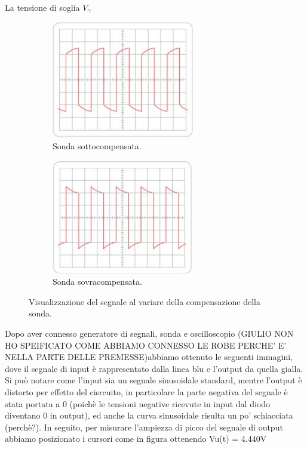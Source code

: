 \documentclass[a4paper]{article}
\begin{document}
{{				La tensione di soglia $ V_{\mathrm{\gamma}} $
				\begin{figure}[h!]
					\centering
					\begin{subfigure}{0.4\textwidth}
						\centering
						\includegraphics[scale=0.5]{sondaSegnaleSottocompensato}
						\caption{Sonda sottocompensata.}
					\end{subfigure}
					\begin{subfigure}{0.4\textwidth}
						\centering
						\includegraphics[scale=0.5]{sondaSegnaleSovracompensato}
						\caption{Sonda sovracompensata.}
					\end{subfigure}
					\caption{Visualizzazione del segnale al variare della compensazione della sonda.}
					\label{fig:sondaSegnaleNonCompensato}
				\end{figure}
				\newline
				Dopo aver connesso generatore di segnali, sonda e oscilloscopio (GIULIO NON HO SPEIFICATO COME ABBIAMO CONNESSO LE ROBE PERCHE' E' NELLA PARTE DELLE PREMESSE)abbiamo ottenuto le seguenti immagini, dove il segnale di input è rappresentato dalla linea blu e l'output da quella gialla. 
				Si può notare come l'input sia un segnale sinusoidale standard, mentre l'output è distorto per effetto del cisrcuito, in particolare la parte negativa del segnale è stata portata a 0 (poichè le tensioni negative ricevute in input dal diodo diventano 0 in output), ed anche la curva sinusoidale risulta un po' schiacciata (perchè?).
				In seguito, per misurare l'ampiezza di picco del segnale di output abbiamo posizionato i cursori come in figura ottenendo Vu(t) = 4.440V %
}}
\end{document}
